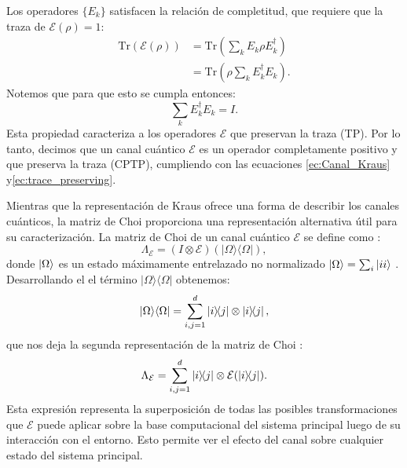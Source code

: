 \documentclass[letterpaper,12pt]{thesisECFM}
\theoremstyle{plain}
\theoremstyle{definition}
\theoremstyle{definition}
\theoremstyle{remark}
\newcommand{\1}{\mathbb{1}}
\begin{document}
Los operadores $\{E_k\}$  satisfacen la relación de completitud, que requiere que la traza de $\mathcal{E}(\rho) = 1$:
\begin{align}
    \text{Tr}(\mathcal{E}(\rho)) &= \text{Tr}\left(\sum_k E_k \rho E_k^\dagger\right) \\
    &= \text{Tr}\left(\rho \sum_k E_k^\dagger E_k \right).
\end{align}
Notemos que para que esto se cumpla entonces:
\begin{equation}
    \sum_k E_k^\dagger E_k = I. \label{ec:trace_preserving}
\end{equation}
Esta propiedad caracteriza a los operadores $\mathcal{E}$ que preservan la traza (TP). Por lo tanto, decimos que un canal cuántico $\mathcal{E}$ es un operador completamente positivo y  que preserva la traza (CPTP), cumpliendo con las ecuaciones \ref{ec:Canal_Kraus}  y\ref{ec:trace_preserving}. 

Mientras que la representación de Kraus ofrece una forma de describir los canales cuánticos, la matriz de Choi proporciona una representación alternativa útil para su caracterización. 
La matriz de Choi de un canal cuántico $\mathcal{E}$ se define como \cite{QProcess}:
\begin{equation} 
\Lambda_{\mathcal{E}} = (I \otimes \mathcal{E})(|\Omega\rangle\langle\Omega|),
\end{equation} 
donde $\ket{\Omega}$ es un estado máximamente entrelazado no normalizado $\ket{\Omega} = \sum_i \ket{ii}$ .
Desarrollando el el término $|\Omega\rangle\langle\Omega|$ obtenemos:
\begin{equation}
|\Omega\rangle\langle\Omega| = \sum_{i,j=1}^{d} \ketbra{i}{j} \otimes \ketbra{i}{j},
\end{equation} 
que nos deja la segunda representación de la matriz de Choi
\cite{Qiskit_documentation} \cite{QProcess}:
\begin{equation}\label{ec:Choi_ketbra}
\Lambda_{\mathcal{E}} = \sum_{i,j=1}^{d} \ketbra{i}{j} \otimes \mathcal{E}(\ketbra{i}{j}).
\end{equation}
Esta expresión representa la superposición de todas las posibles transformaciones que $\mathcal{E}$ puede aplicar sobre la base computacional del sistema principal luego de su interacción con el entorno. Esto permite ver el efecto del canal sobre cualquier estado del sistema principal.
\end{document}
